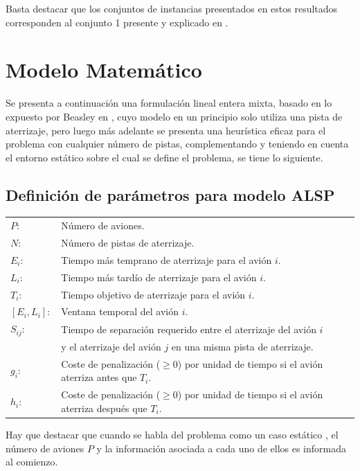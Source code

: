\documentclass[letter, 10pt]{article}
\begin{document}
Basta destacar que los conjuntos de instancias presentados en estos resultados corresponden al conjunto 1 presente y explicado en \cite{SALEHIPOUR2020179}.





\newpage
\section{Modelo Matemático}
Se presenta a continuación una formulación lineal entera mixta, basado en lo expuesto por Beasley en \cite{article1}, cuyo modelo en un principio solo utiliza una pista de aterrizaje, pero luego más adelante se presenta una heurística eficaz para el problema con cualquier número de pistas, complementando y teniendo en cuenta el entorno estático sobre el cual se define el problema, se tiene lo siguiente.\\

\subsection{Definición de parámetros para modelo ALSP}
\begin{table}[h]
\begin{tabular}{ll}
$P:$  & Número de aviones.  \\
$N:$  & Número de pistas de aterrizaje.  \\
$E_i:$ & Tiempo más temprano de aterrizaje para el avión $i$.\\
$L_i:$ & Tiempo más tardío de aterrizaje para el avión $i$.\\
$T_i:$ & Tiempo objetivo de aterrizaje para el avión $i$.\\
$[E_i,L_i]:$ & Ventana temporal del avión $i$.\\
${S}_{ij}:$ & Tiempo de separación requerido entre el aterrizaje del avión $i$ \\
& y el aterrizaje del avión $j$ en una misma pista de aterrizaje.\\
$g_i:$ & Coste de penalización ($\geq 0$) por unidad de tiempo si el avión aterriza antes que $T_i$.\\
$h_i:$ & Coste de penalización ($\geq 0$) por unidad de tiempo si el avión aterriza después que $T_i$.
\end{tabular}
\end{table}

Hay que destacar que cuando se habla del problema como un caso estático \cite{article1}, el número de aviones $P$ y la información asociada a cada uno de ellos es informada al comienzo.
\end{document}
